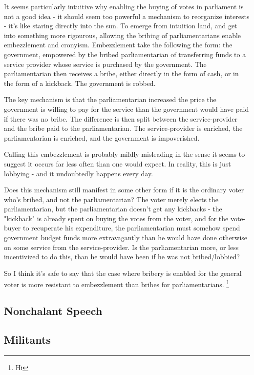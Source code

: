 It seems particularly intuitive why enabling the buying of votes in parliament is not a good idea - it should seem too powerful a mechanism to reorganize interests - it's like staring directly into the sun. To emerge from intuition land, and get into something more rigourous, allowing the bribing of parliamentarians enable embezzlement and cronyism. Embezzlement take the following the form: the government, empowered by the bribed parliamentarian of transferring funds to a service provider whose service is purchased by the government. The parliamentarian then receives a bribe, either directly in the form of cash, or in the form of a kickback. The government is robbed. 

The key mechanism is that the parliamentarian increased the price the government is willing to pay for the service than the government would have paid if there was no bribe. The difference is then split between the service-provider and the bribe paid to the parliamentarian. The service-provider is enriched, the parliamentarian is enriched, and the government is impoverished. 

Calling this embezzlement is probably mildly misleading in the sense it seems to suggest it occurs far less often than one would expect. In reality, this is just lobbying - and it undoubtedly happens every day.


Does this mechanism still manifest in some other form if it is the ordinary voter who's bribed, and not the parliamentarian? The voter merely elects the parliamentarian, but the parliamentarian doesn't get any kickbacks - the "kickback" is already spent on buying the votes from the voter, and for the vote-buyer to recuperate his expenditure, the parliamentarian must somehow spend government budget funds more extravagantly than he would have done otherwise on some service from the service-provider. Is the parliamentarian more, or less incentivized to do this, than he would have been if he was not bribed/lobbied? 



So I think it's safe to say that the case where bribery is enabled for the general voter is more resistant to embezzlement than bribes for parliamentarians. \footnote{Hi}

\subsection{Nonchalant Speech}

\subsection{Militants}


